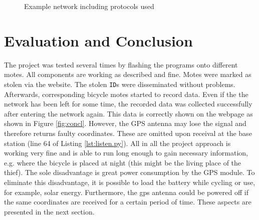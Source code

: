 \documentclass[a4paper]{article}
\begin{document}
\begin{figure}[h!]
\begin{center}
\end{center}
\caption{Example network including protocols used}\label{fig:topo}
\end{figure}

\section{Evaluation and Conclusion}
The project was tested several times by flashing the programs onto different motes. All components are working as described and fine. Motes were marked as stolen via the website. The stolen \texttt{ID}s were disseminated without problems. Afterwards, corresponding bicycle motes started to record data. Even if the the network has been left for some time, the recorded data was collected successfully after entering the network again. This data is correctly shown on the webpage as shown in Figure \ref{fig:concl}. However, the GPS antenna may lose the signal and therefore returns faulty coordinates. These are omitted upon receival at the base station (line 64 of Listing \ref{lst:listen.py}).
All in all the project approach is working very fine and is able to run long enough to gain necessary information, e.g. where the bicycle is placed at night (this might be the living place of the thief). The sole disadvantage is great power consumption by the GPS module. To eliminate this disadvantage, it is possible to load the battery while cycling or use, for example, solar energy. Furthermore, the gps antenna could be powered off if the same coordinates are received for a certain period of time. These aspects are presented in the next section.
\end{document}
